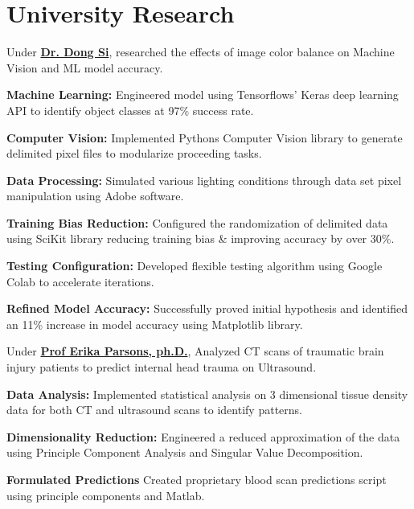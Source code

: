\documentclass[]{deedy-resume-openfont}
\begin{document}
\begin{minipage}[t]{0.64\textwidth}
\section{University Research}
Under \textbf{\href{https://sites.google.com/uw.edu/dais-uw/home?authuser=0}{Dr. Dong Si}}, researched the effects of image color balance on Machine Vision and ML model accuracy. \newline
    \begin{tightemize}
        \item \textbf{Machine Learning: } Engineered model using Tensorflows’ Keras deep learning API to identify object classes at 97\% success rate.
        \item \textbf{Computer Vision: } Implemented Pythons Computer Vision library to generate delimited pixel files to modularize proceeding tasks.
        \item \textbf{Data Processing: } Simulated various lighting conditions through data set pixel manipulation using Adobe software. \item 
        \textbf{Training Bias Reduction: } Configured the randomization of delimited data using SciKit library reducing training bias \& improving accuracy by over 30\%.
        \item \textbf{Testing Configuration: } Developed flexible testing algorithm using Google Colab to accelerate iterations. 
        \item \textbf{Refined Model Accuracy: } Successfully proved initial hypothesis and identified an 11\% increase in model accuracy using Matplotlib library.
    \end{tightemize}
\sectionsep

Under \textbf{\href{https://www.uwb.edu/css/faculty/bios/eparsons}{Prof Erika Parsons, ph.D.}}, Analyzed CT scans of traumatic brain injury patients to predict internal head trauma on Ultrasound.
\begin{tightemize}
\item \textbf{Data Analysis: } Implemented statistical analysis on 3 dimensional tissue density data for both CT and ultrasound scans to identify patterns.
\item \textbf{Dimensionality Reduction: } Engineered a reduced approximation of the data using Principle Component Analysis and Singular Value Decomposition.
\item \textbf{Formulated Predictions} Created proprietary blood scan predictions script using principle components and Matlab.
\end{tightemize}
\sectionsep


\end{minipage}
\end{document}
